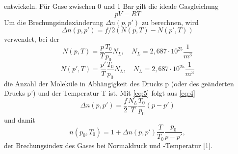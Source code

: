 entwickeln. Für Gase zwischen 0 und 1 Bar gilt die ideale Gasgleichung
\begin{equation}
  pV=RT 
  \label{eq:3}
\end{equation}
Um die Brechungsindexänderung $\Delta n(p,p')$ zu berechnen, wird 
\begin{equation}
  \Delta n(p,p')=f/2(N(p,T)-N(p',T))
  \label{eq:4}
\end{equation}
verwendet, bei der 
\begin{equation}
  N(p,T)=\frac{p}{T}\frac{T_{0}}{p_{0}}N_{L}, \quad N_{L}=2,687\cdot 10^25\frac{1}{m^3} \nonumber
\end{equation}
\begin{equation}
  N(p',T)=\frac{p'}{T}\frac{T_{0}}{p_{0}}N_{L}, \quad N_{L}=2,687\cdot 10^25\frac{1}{m^3}
  \label{eq:5}
\end{equation}
die Anzahl der Moleküle in Abhängigkeit des Drucks p (oder des geänderten Drucks p') und der Temperatur T ist.
Mit \eqref{eq:5} folgt aus \eqref{eq:4}
\begin{equation}
  \Delta n(p,p')=\frac{f}{2}\frac{N_{L}}{T}\frac{T_{0}}{p_{0}}(p-p') 
  \label{eq:5}
\end{equation}
und damit
\begin{equation}
  n(p_{0},T_{0})=1+\Delta n(p,p')\frac{T}{T_{0}}\frac{p_0}{p-p'},
  \label{eq:6}
\end{equation}
der Brechungsindex des Gases bei Normaldruck und -Temperatur [1].
